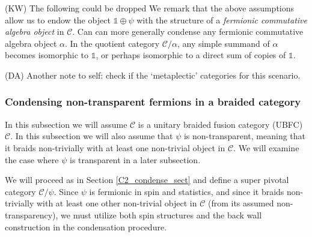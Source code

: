 \documentclass[12pt,a4paper]{article}
\newcommand{\tp}{\otimes}
\newcommand{\unit}{\mathds{1}}
\newcommand{\mcc}{\mathcal{C}}
\newcommand{\kw}[1]{{\color{kwcolor}\footnotesize{(KW) #1}}}
\newcommand{\dave}[1]{{\color{ao(english)}\footnotesize{(DA) #1}}}
\begin{document}

\kw{The following could be dropped}
We remark that the above assumptions allow us to endow the object $\unit\oplus\psi$ 
with the structure of a {\it fermionic commutative algebra object} in $\mcc$.
Can can more generally condense any fermionic commutative algebra object $\alpha$.
In the quotient category $\mcc/\alpha$, any simple summand of $\alpha$ becomes isomorphic to $\unit$,
or perhaps isomorphic to a direct sum of copies of $\unit$.


\dave{Another note to self: check if the `metaplectic' categories for this scenario.}


\subsubsection{Condensing non-transparent fermions in a braided category}  \label{gntf_condense}


In this subsection we will assume $\mcc$ is a unitary braided fusion category (UBFC) $\mathcal{C}$.
In this subsection we will also assume that $\psi$ is non-transparent, meaning that it braids non-trivially with at least one non-trivial object in $\mcc$. 
We will examine the case where $\psi$ is transparent in a later subsection. 


We will proceed 
as in Section \ref{C2_condense_sect} and define a super pivotal category $\mcc/\psi$. 
Since $\psi$ is fermionic in spin and statistics, and since it braids non-trivially with 
at least one other non-trivial object in $\mcc$ (from its assumed non-transparency), we
must utilize both spin structures and the back wall construction in the condensation 
procedure. 
\end{document}
